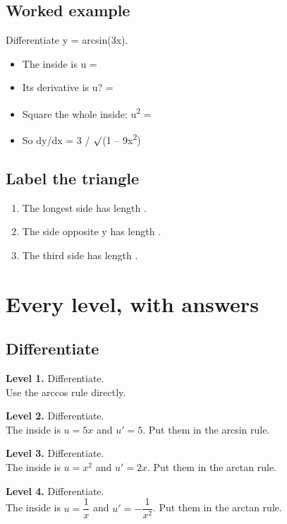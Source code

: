 \documentclass[11pt]{article}
\begin{document}
\subsection*{Worked example}
Differentiate y = arcsin(3x).\\
\begin{itemize}
\item The inside is u = 
\item Its derivative is u? = 
\item Square the whole inside: u\textsuperscript{2} = 
\item So dy/dx = 3 / $\surd$(1 -- 9x\textsuperscript{2})
\end{itemize}
\subsection*{Label the triangle}
\begin{enumerate}
\item The longest side has length .
\item The side opposite y has length .
\item The third side has length .
\end{enumerate}
\section*{Every level, with answers}
\subsection*{Differentiate}
\noindent\textbf{Level 1.} Differentiate.\\  \quad Use the arccos rule directly.\par\medskip
\noindent\textbf{Level 2.} Differentiate.\\  \quad The inside is $u=5x$ and $u'=5$. Put them in the arcsin rule.\par\medskip
\noindent\textbf{Level 3.} Differentiate.\\  \quad The inside is $u=x^{2}$ and $u'=2x$. Put them in the arctan rule.\par\medskip
\noindent\textbf{Level 4.} Differentiate.\\  \quad The inside is $u=\dfrac1x$ and $u'=-\dfrac1{x^2}$. Put them in the arctan rule.\par\medskip
\end{document}
